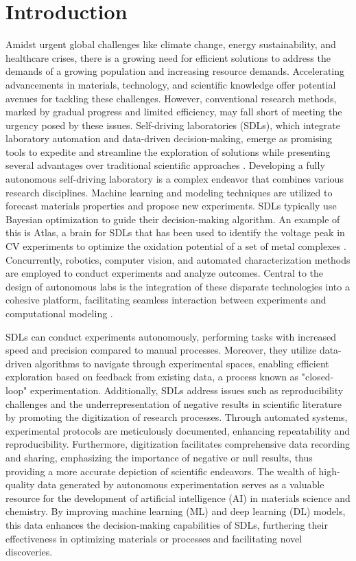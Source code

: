 \chapter{Introduction} \label{introduction}
Amidst urgent global challenges like climate change, energy sustainability, and healthcare crises, there is a growing need for efficient solutions to address the demands of a growing population and increasing resource demands. Accelerating advancements in materials, technology, and scientific knowledge offer potential avenues for tackling these challenges. However, conventional research methods, marked by gradual progress and limited efficiency, may fall short of meeting the urgency posed by these issues. Self-driving laboratories (SDLs), which integrate laboratory automation and data-driven decision-making, emerge as promising tools to expedite and streamline the exploration of solutions while presenting several advantages over traditional scientific approaches \cite{Tom2024}. Developing a fully autonomous self-driving laboratory is a complex endeavor that combines various research disciplines. Machine learning and modeling techniques are utilized to forecast materials properties and propose new experiments. SDLs typically use Bayesian optimization to guide their decision-making algorithm. An example of this is Atlas, a brain for SDLs that has been used to identify the voltage peak in CV experiments to optimize the oxidation potential of a set of metal complexes \cite{Hickman2023}. Concurrently, robotics, computer vision, and automated characterization methods are employed to conduct experiments and analyze outcomes. Central to the design of autonomous labs is the integration of these disparate technologies into a cohesive platform, facilitating seamless interaction between experiments and computational modeling \cite{StriethKalthoff2023}. 

SDLs can conduct experiments autonomously, performing tasks with increased speed and precision compared to manual processes. Moreover, they utilize data-driven algorithms to navigate through experimental spaces, enabling efficient exploration based on feedback from existing data, a process known as "closed-loop" experimentation. Additionally, SDLs address issues such as reproducibility challenges and the underrepresentation of negative results in scientific literature by promoting the digitization of research processes. Through automated systems, experimental protocols are meticulously documented, enhancing repeatability and reproducibility. Furthermore, digitization facilitates comprehensive data recording and sharing, emphasizing the importance of negative or null results, thus providing a more accurate depiction of scientific endeavors. The wealth of high-quality data generated by autonomous experimentation serves as a valuable resource for the development of artificial intelligence (AI) in materials science and chemistry. By improving machine learning (ML) and deep learning (DL) models, this data enhances the decision-making capabilities of SDLs, furthering their effectiveness in optimizing materials or processes and facilitating novel discoveries.

